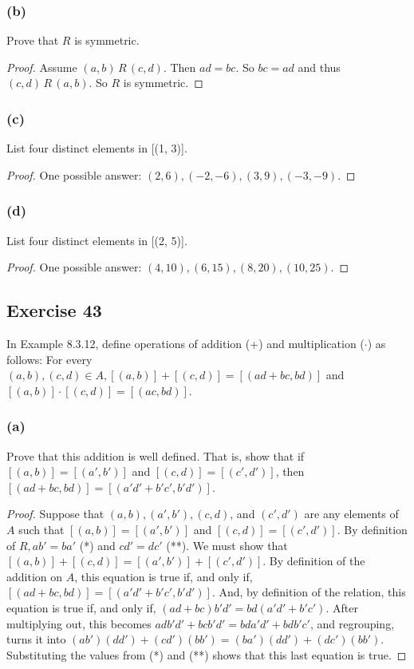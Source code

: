 \documentclass[14pt]{extarticle}
\begin{document}
\subsubsection{(b)}
Prove that $R$ is symmetric.

\begin{proof}
Assume \((a,b) \,R\, (c,d)\). Then \(ad = bc\). So \(bc = ad\) and thus \((c,d) \,R\, (a,b)\). So $R$ is symmetric.
\end{proof}

\subsubsection{(c)}
List four distinct elements in [(1, 3)].

\begin{proof}
One possible answer: \((2, 6), (-2, -6), (3, 9), (-3, -9)\).
\end{proof}

\subsubsection{(d)}
List four distinct elements in [(2, 5)].

\begin{proof}
One possible answer: \((4, 10), (6, 15), (8, 20), (10, 25)\).
\end{proof}

\subsection{Exercise 43}
In Example 8.3.12, define operations of addition (+) and multiplication (\(\cdot\)) as follows: For every \((a, b), 
(c, d) \in A, [(a, b)] + [(c, d)] = [(ad + bc, bd)]\) and \([(a, b)] \cdot [(c, d)] = [(ac, bd)]\).

\subsubsection{(a)}
Prove that this addition is well defined. That is, show that if \([(a, b)] = [(a', b')]\) and \([(c, d)] = [(c', 
d')]\), then \([(ad + bc, bd)] = [(a'd' + b'c', b'd')]\).

\begin{proof}
Suppose that \((a, b), (a', b'), (c, d)\), and \((c', d')\) are any elements of \(A\) such that \([(a, b)]=[(a', b')]\) 
and \([(c, d)] = [(c', d')]\). By definition of \(R, ab' = ba'\) (*) and \(cd' = dc'\) (**). We must show that 
\([(a, b)] + [(c, d)] = [(a', b')] + [(c', d')]\). By definition of the addition on \(A\), this equation is true 
if, and only if, \([(ad + bc, bd)] = [(a'd' + b'c', b'd')]\). And, by definition of the relation, this equation is 
true if, and only if, \((ad + bc)b'd' = bd(a'd' + b'c')\). After multiplying out, this becomes \(adb'd' + bcb'd' = 
bda'd' + bdb'c'\), and regrouping, turns it into \((ab')(dd') + (cd')(bb') = (ba')(dd') + (dc')(bb')\). 
Substituting the values from (*) and (**) shows that this last equation is true. 
\end{proof}
\end{document}
